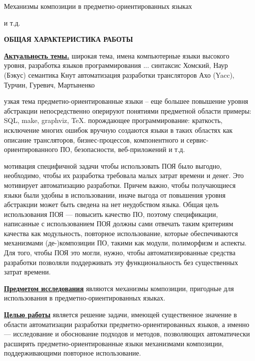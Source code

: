 \documentclass[12pt,a4paper]{article}
\date{}
\makeatletter
\renewcommand{\@oddhead}{\hfill{\large -\thepage-}\hfill}
\renewcommand{\@oddfoot}{}
\renewcommand{\@evenhead}{\hfill{\large -\thepage-}\hfill}
\renewcommand{\@evenfoot}{}
\newcommand{\afsection}[1]{\par \begin{center}\textbf{\MakeUppercase{#1}}\end{center}}
\newcommand{\afsubsection}[1]{\par \textbf{\underline{#1}}}
\makeatother
\begin{document}
Механизмы композиции в предметно-ориентированных языках

и т.д.

\thispagestyle{empty}
\newpage


\setlength{\topmargin}{-5mm} \makeatletter
\renewcommand{\@oddhead}{\hfill{\large -\thepage-}\hfill}
\renewcommand{\@oddfoot}{}
\renewcommand{\@evenhead}{\hfill{\large -\thepage-}\hfill}
\renewcommand{\@evenfoot}{}
\makeatother

\afsection{Общая характеристика работы}

\afsubsection{Актуальность темы.}
широкая тема, имена
компьютерные языки высокого уровня, разработка языков программирования ...
синтаксис
Хомский, Наур (Бэкус)
семантика Кнут
автоматизация разработки трансляторов
Ахо (Yacc), Турчин, Гуревич, Мартыненко

узкая тема
предметно-ориентированные языки -- еще большее повышение уровня абстракции
непосредственно оперируют понятиями предметной области
примеры: SQL, make, graphviz, \TeX.
порождающее программирование: краткость, исключение многих ошибок
вручную создаются языки в таких областях как описание трансляторов, бизнес-процессов, компонентного и сервис-ориентированного ПО, безопасности, веб-приложений и т.д.

мотивация специфичной задачи
чтобы использовать ПОЯ было выгодно, необходимо, чтобы их разработка требовала малых затрат времени и денег. Это мотивирует автоматизацию разработки. Причем важно, чтобы получающиеся языки были удобны в использовании, иначе выгода от повышения уровня абстракции может быть сведена на нет неудобством языка. Общая цель использования ПОЯ --- повысить качество ПО, поэтому спецификации, написанные с использованием ПОЯ должны сами отвечать таким критериям качества как модульность, повторное использование, которые обеспечиваются механизмами (де-)композиции ПО, такими как модули, полиморфизм и аспекты. Для того, чтобы ПОЯ это могли, нужно, чтобы автоматизированные средства разработки позволяли поддерживать эту функциональность без существенных затрат времени.

\afsubsection{Предметом исследования} являются механизмы композиции, пригодные для использования в предметно-ориентированных языках.

\afsubsection{Целью работы} является решение задачи, имеющей существенное значение в области автоматизации разработки предметно-ориентированных языков, а именно --- исследование и обоснование подходов и методов, позволяющих автоматически расширять предметно-ориентированные языки механизмами композиции, поддерживающими повторное использование.
\end{document}
